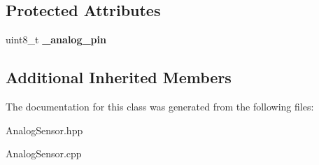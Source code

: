 \subsection*{Protected Attributes}
\begin{DoxyCompactItemize}
\item 
\mbox{\label{classwood_box_1_1sensor_1_1_analog_sensor_a0377173a16668660f492c52694f96fab}} 
uint8\+\_\+t {\bfseries \+\_\+analog\+\_\+pin}
\end{DoxyCompactItemize}
\subsection*{Additional Inherited Members}


The documentation for this class was generated from the following files\+:\begin{DoxyCompactItemize}
\item 
Analog\+Sensor.\+hpp\item 
Analog\+Sensor.\+cpp\end{DoxyCompactItemize}
